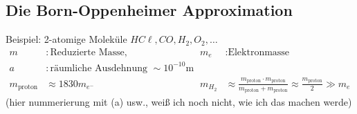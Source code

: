\subsection{Die Born-Oppenheimer Approximation}
	Beispiel: 2-atomige Moleküle $H C\ell, CO, H_2, O_2, \ldots$ 
		\begin{align*}
			m &: \text{Reduzierte Masse} ,& m_e &: \text{Elektronmasse} \\
			a &: \text{räumliche Ausdehnung } \sim 10^{-10}\mathrm{m} \\
			m_{\text{proton}} &\approx 1830 m_{e^-} &
			m_{H_2} &\approx \frac{m_{\text{proton}} \cdot m_{\text{proton}}}{m_{\text{proton}} + m_{\text{proton}}} \approx \frac{m_{\text{proton}}}{2} \gg m_e
		\end{align*}	
	(hier nummerierung mit (a) usw., weiß ich noch nicht, wie ich das machen werde)
